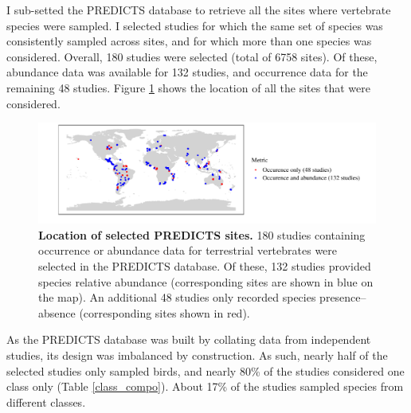 I sub-setted the PREDICTS database to retrieve all the sites where vertebrate species were sampled. I selected studies for which the same set of species was consistently sampled across sites, and for which more than one species was considered. Overall, 180 studies were selected (total of 6758 sites). Of these, abundance data was available for 132 studies, and occurrence data for the remaining 48 studies. Figure \ref{PREDICTS_maps} shows the location of all the sites that were considered.

\begin{figure}[h!]
\centering
\includegraphics[scale=0.75]{figures/chapter3/Sites}
\caption[Location of selected PREDICTS sites]{\textbf{Location of selected PREDICTS sites.} 180 studies containing occurrence or abundance data for terrestrial vertebrates were selected in the PREDICTS database. Of these, 132 studies provided species relative abundance (corresponding sites are shown in blue on the map). An additional 48 studies only recorded species presence--absence (corresponding sites shown in red).}
\label{PREDICTS_maps}
\end{figure}

As the PREDICTS database was built by collating data from independent studies, its design was imbalanced by construction. As such, nearly half of the selected studies only sampled birds, and nearly 80\% of the studies considered one class only (Table \ref{class_compo}). About 17\% of the studies sampled species from different classes. 

